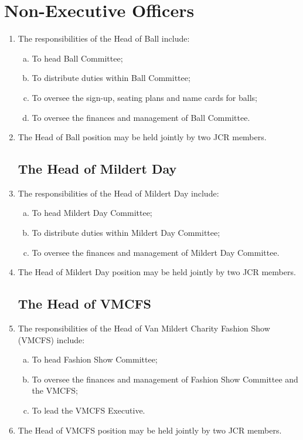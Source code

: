 \documentclass[12pt]{article}  %
\begin{document}
\section{Non-Executive Officers}
\begin{enumerate}
	\subsection{The Head of Ball}
	\item The responsibilities of the Head of Ball include:
	\begin{enumerate}[(a)]
		\item To head Ball Committee;
		\item To distribute duties within Ball Committee;
		\item To oversee the sign-up, seating plans and name cards for balls;
		\item To oversee the finances and management of Ball Committee.
	\end{enumerate}
	\item The Head of Ball position may be held jointly by two JCR members.
	\subsection{The Head of Mildert Day}
	\item The responsibilities of the Head of Mildert Day include:
	\begin{enumerate}[(a)]
		\item To head Mildert Day Committee;
		\item To distribute duties within Mildert Day Committee;
		\item To oversee the finances and management of Mildert Day Committee.
	\end{enumerate}
	\item The Head of Mildert Day position may be held jointly by two JCR members.
	\subsection{The Head of VMCFS}
	\item The responsibilities of the Head of Van Mildert Charity Fashion Show (VMCFS) include:
	\begin{enumerate}[(a)]
		\item To head Fashion Show Committee;
		\item To oversee the finances and management of Fashion Show Committee and the VMCFS;
		\item To lead the VMCFS Executive.
	\end{enumerate}
	\item The Head of VMCFS position may be held jointly by two JCR members.

\end{enumerate}
\end{document}
